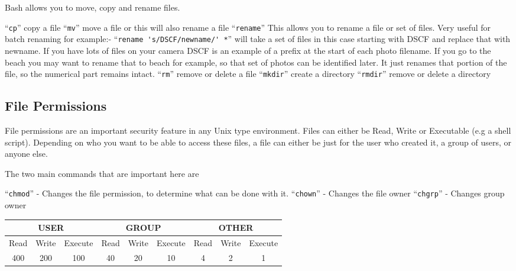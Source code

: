 \documentclass{book}
\begin{document}
Bash allows you to move, copy and rename files.

``\verb|cp|'' copy a file
``\verb|mv|'' move a file or this will also rename a file
``\verb|rename|'' This allows you to rename a file or set of files. Very useful for batch renaming for example:-
``\verb|rename 's/DSCF/newname/' *|'' will take a set of files in this case starting with DSCF and replace that with newname. If you have lots of files on your camera DSCF is an example of a prefix at the start of each photo filename. If you go to the beach you may want to rename that to beach for example, so that set of photos can be identified later. It just renames that portion of the file, so the numerical part remains intact.
``\verb|rm|'' remove or delete a file
``\verb|mkdir|'' create a directory
``\verb|rmdir|'' remove or delete a directory

\subsection{File Permissions}

File permissions are an important security feature in any Unix type environment. Files can either be Read, Write or Executable (e.g a shell script). Depending on who you want to be able to access these files, a file can either be just for the user who created it, a group of users, or anyone else.

The two main commands that are important here are

``\verb|chmod|'' - Changes the file permission, to determine what can be done with it.
``\verb|chown|'' - Changes the file owner
``\verb|chgrp|'' - Changes group owner

\begin{table}[h]
\begin{tabular}{|ccc|ccc|ccc|}
\hline
\multicolumn{3}{|c|}{\textbf{USER}}                               & \multicolumn{3}{c|}{\textbf{GROUP}}                              & \multicolumn{3}{c|}{\textbf{OTHER}}                              \\ \hline
\multicolumn{1}{|c|}{Read} & \multicolumn{1}{c|}{Write} & Execute & \multicolumn{1}{c|}{Read} & \multicolumn{1}{c|}{Write} & Execute & \multicolumn{1}{c|}{Read} & \multicolumn{1}{c|}{Write} & Execute \\ \hline
\multicolumn{1}{|c|}{400}  & \multicolumn{1}{c|}{200}   & 100     & \multicolumn{1}{c|}{40}   & \multicolumn{1}{c|}{20}    & 10      & \multicolumn{1}{c|}{4}    & \multicolumn{1}{c|}{2}     & 1       \\ \hline
\end{tabular}
\end{table}
\end{document}
